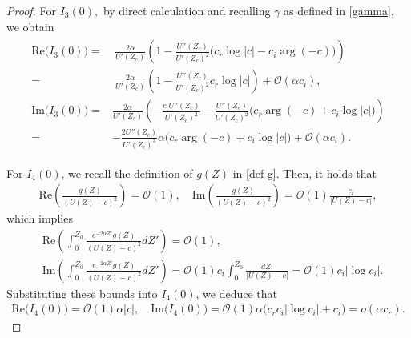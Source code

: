\documentclass[reqno,11pt]{amsart}
\numberwithin{equation}{section}
\numberwithin{equation}{section}
\theoremstyle{plain}
\begin{document}
\begin{proof}
		
	    For $I_3(0),$ by direct calculation and recalling $\gamma$ as defined in \eqref{gamma}, we obtain 
		\begin{align}\label{I3-0-part}\begin{aligned}
				\text{Re}\big(I_{3}(0)\big)= &~ \frac{2\alpha}{U'(Z_c)}\left(1-\frac{U''(Z_c)}{U'(Z_c)^2}\Big(c_r\log|c|-c_i\arg(-c)\Big)\right) \\
				= &~ \frac{2\alpha}{U'(Z_c)}\left(1-\frac{U''(Z_c)}{U'(Z_c)^2}c_r\log|c|\right)
				+\mathcal{O}(\alpha c_i),\\
				\text{Im}\big(I_{3}(0)\big)= & \frac{2\alpha}{U'(Z_c)}\left(-\frac{c_iU''(Z_c)}{U'(Z_c)^2}
				-\frac{U''(Z_c)}{U'(Z_c)^2}\big(c_r\arg(-c)+c_i\log|c|\big)\right) \\
				= & -\frac{2U''(Z_c)}{U'(Z_c)^3}\alpha\big(c_r\arg(-c)+c_i\log|c|\big)
				+\mathcal{O}(\alpha c_i).
		\end{aligned}\end{align}
		
		
		For $I_4(0)$, we recall the definition of $g(Z)$ in  \eqref{def-g}. Then, it holds that
		\begin{align}\label{g-part}
			\text{Re}\left(\frac{g(Z)}{(U(Z)-c)^2}\right)=\mathcal{O}(1),\quad  \text{Im}\left(\frac{g(Z)}{(U(Z)-c)^2}\right)%
			=\mathcal{O}(1)\frac{c_i}{|U(Z)-c|},
		\end{align}
		which implies
		\begin{align*}
			&\text{Re}\left(\int_{0}^{Z_0}\frac{e^{-2\alpha Z'}g(Z)}{(U(Z)-c)^2}dZ'\right)  =\mathcal{O}(1),\\
			&\text{Im}\left(\int_{0}^{Z_0}\frac{e^{-2\alpha Z'}g(Z)}{(U(Z)-c)^2}dZ'\right)  =\mathcal{O}(1)c_i\int_{0}^{Z_0}\frac{dZ'}{|U(Z)-c|}=\mathcal{O}(1)c_i|\log c_i|.
		\end{align*}
		Substituting these bounds into $I_4(0)$, we deduce that
		\begin{align}\label{I4-0-part}
			\text{Re}\big(I_4(0)\big)  =\mathcal{O}(1)\alpha |c|,\quad
			\text{Im}\big(I_4(0)\big) =\mathcal{O}(1)\alpha\big(c_r c_i|\log c_i|+c_i\big)
			=o(\alpha c_r).
		\end{align}
		

\end{proof}
\end{document}
